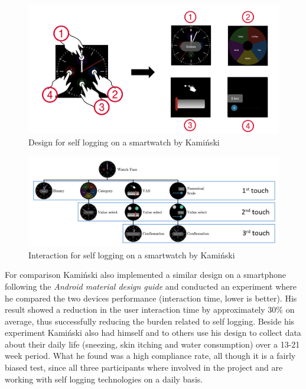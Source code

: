 \begin{figure}[h!]
    \centering
    \includegraphics[width=1\textwidth]{figures/tomas_design.png}
    \caption{Design for self logging on a smartwatch by Kami\'nski\cite[p.23]{tomas}}
    \label{tomas_design}
\end{figure}

\begin{figure}[h!]
    \centering
    \includegraphics[width=1\textwidth]{figures/tomas_design2.png}
    \caption{Interaction for self logging on a smartwatch by Kami\'nski\cite[p.23]{tomas}}
    \label{tomas_design2}
\end{figure}

For comparison Kami\'nski also implemented a similar design on a smartphone following the \emph{Android material design guide}\cite{android_design} and conducted an experiment where he compared the two devices performance (interaction time, lower is better). His result showed a reduction in the user interaction time by approximately 30\% on average, thus successfully reducing the burden related to self logging. Beside his experiment Kami\'nski also had himself and to others use his design to collect data about their daily life (sneezing, skin itching and water consumption) over a 13-21 week period. What he found was a high compliance rate, all though it is a fairly biased test, since all three participants where involved in the project and are working with self logging technologies on a daily basis. 

